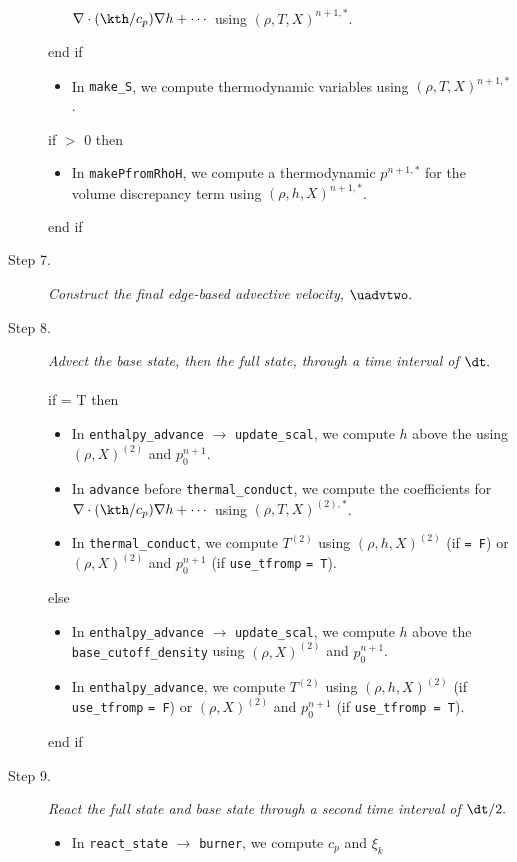 \begin{description}
\begin{itemize}
$\nabla\cdot(\kth/c_p)\nabla h + \cdots$ using $(\rho,T,X)^{n+1,*}$.
\end{itemize}
end if
\begin{itemize}
\item In {\tt make\_S}, we compute thermodynamic variables using $(\rho,T,X)^{n+1,*}$.
\end{itemize}
if  $>$ 0 then
\begin{itemize}
\item In {\tt makePfromRhoH}, we compute a thermodynamic $p^{n+1,*}$ for the volume 
discrepancy term using $(\rho,h,X)^{n+1,*}$.
\end{itemize}
end if
\item[Step 7.] {\em Construct the final edge-based advective velocity, $\uadvtwo.$}
\item[Step 8.] {\em Advect the base state, then the full state, through a time interval 
of $\dt.$}\\ \\
if  = T then
\begin{itemize}
\item In {\tt enthalpy\_advance} $\rightarrow$ {\tt update\_scal}, we compute $h$ above
the  using $(\rho,X)^{(2)}$ and $p_0^{n+1}$.
\item In {\tt advance} before {\tt thermal\_conduct}, we compute the coefficients for 
$\nabla\cdot(\kth/c_p)\nabla h + \cdots$ using $(\rho,T,X)^{(2),*}$.
\item In {\tt thermal\_conduct}, we compute $T^{(2)}$ using $(\rho,h,X)^{(2)}$
(if  {\tt = F}) or $(\rho,X)^{(2)}$ and $p_0^{n+1}$ (if {\tt use\_tfromp} {\tt = T}).
\end{itemize}
else
\begin{itemize}
\item In {\tt enthalpy\_advance} $\rightarrow$ {\tt update\_scal}, we compute $h$ above
the {\tt base\_cutoff\_density} using $(\rho,X)^{(2)}$ and $p_0^{n+1}$.
\item In {\tt enthalpy\_advance}, we compute $T^{(2)}$ using $(\rho,h,X)^{(2)}$
(if {\tt use\_tfromp} {\tt = F}) or $(\rho,X)^{(2)}$ and $p_0^{n+1}$ (if {\tt use\_tfromp = T}).
\end{itemize}
end if
\item[Step 9.] {\em React the full state and base state through a second time interval 
of $\dt/2.$}
\begin{itemize}
\item In {\tt react\_state} $\rightarrow$ {\tt burner}, we compute $c_p$ and $\xi_k$ 

\end{itemize}
\end{description}
